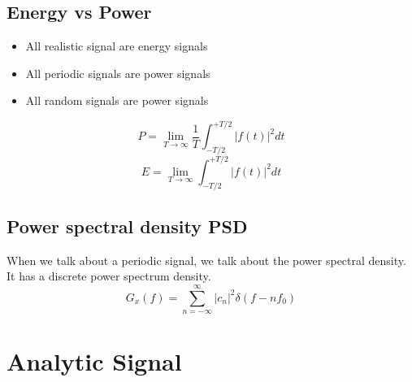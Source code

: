 \subsection{Energy vs Power}
\begin{itemize}
\item All realistic signal are energy signals
\item All periodic signals are power signals
\item All random signals are power signals
\end{itemize}
$$
P=\lim _{T \rightarrow \infty} \frac{1}{T} \int_{-T / 2}^{+T / 2}|f(t)|^2 d t
$$
$$
E=\lim _{T \rightarrow \infty} \int_{-T / 2}^{+T / 2}|f(t)|^2 d t
$$

\subsection{Power spectral density PSD}
When we talk about a periodic signal, we talk about the power spectral density. It has a discrete power spectrum density.
$$
G_x(f)=\sum_{n=-\infty}^{\infty}\left|c_n\right|^2 \delta\left(f-n f_0\right)
$$
\section{Analytic Signal}
